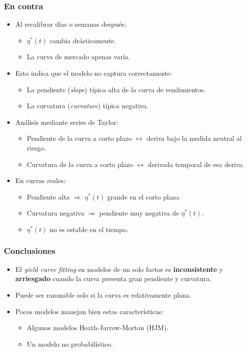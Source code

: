 \subsubsection*{En contra}
\begin{itemize}
    \item Al recalibrar días o semanas después:
    \begin{itemize}
        \item $\eta^*(t)$ cambia drásticamente.
        \item La curva de mercado apenas varía.
    \end{itemize}
    \item Esto indica que el modelo no captura correctamente:
    \begin{itemize}
        \item La pendiente (\textit{slope}) típica alta de la curva de rendimientos.
        \item La curvatura (\textit{curvature}) típica negativa.
    \end{itemize}
    \item Análisis mediante series de Taylor:
    \begin{itemize}
        \item Pendiente de la curva a corto plazo $\leftrightarrow$ deriva bajo la medida neutral al riesgo.
        \item Curvatura de la curva a corto plazo $\leftrightarrow$ derivada temporal de esa deriva.
    \end{itemize}
    \item En curvas reales:
    \begin{itemize}
        \item Pendiente alta $\Rightarrow$ $\eta^*(t)$ grande en el corto plazo.
        \item Curvatura negativa $\Rightarrow$ pendiente muy negativa de $\eta^*(t)$.
        \item $\eta^*(t)$ no es estable en el tiempo.
    \end{itemize}
\end{itemize}

\subsubsection*{Conclusiones}
\begin{itemize}
    \item El \textit{yield curve fitting} en modelos de un solo factor es \textbf{inconsistente} y \textbf{arriesgado} cuando la curva presenta gran pendiente y curvatura.
    \item Puede ser razonable solo si la curva es relativamente plana.
    \item Pocos modelos manejan bien estas características:
    \begin{itemize}
        \item Algunos modelos Heath-Jarrow-Morton (HJM).
        \item Un modelo no probabilístico.
    \end{itemize}
\end{itemize}





